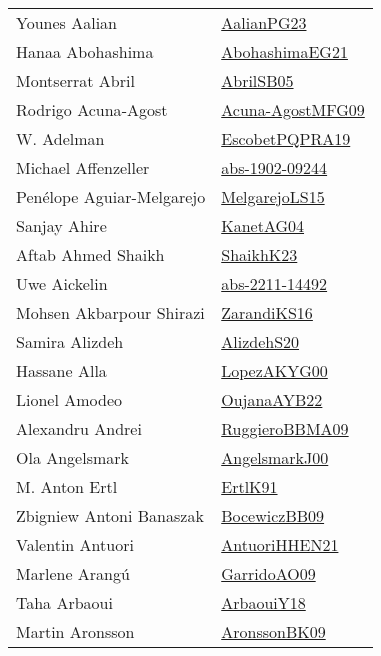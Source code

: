 {\begin{longtable}{p{4cm}p{20cm}}
Younes Aalian & \href{papers/AalianPG23.pdf}{AalianPG23}\cite{AalianPG23} \\
Hanaa Abohashima & \href{articles/AbohashimaEG21.pdf}{AbohashimaEG21}\cite{AbohashimaEG21} \\
Montserrat Abril & \href{papers/AbrilSB05.pdf}{AbrilSB05}\cite{AbrilSB05} \\
Rodrigo Acuna{-}Agost & \href{papers/Acuna-AgostMFG09.pdf}{Acuna-AgostMFG09}\cite{Acuna-AgostMFG09} \\
W. Adelman & \href{articles/EscobetPQPRA19.pdf}{EscobetPQPRA19}\cite{EscobetPQPRA19} \\
Michael Affenzeller & \href{articles/abs-1902-09244.pdf}{abs-1902-09244}\cite{abs-1902-09244} \\
Pen{\'{e}}lope Aguiar{-}Melgarejo & \href{papers/MelgarejoLS15.pdf}{MelgarejoLS15}\cite{MelgarejoLS15} \\
Sanjay Ahire & \href{}{KanetAG04}\cite{KanetAG04} \\
Aftab Ahmed Shaikh & \href{}{ShaikhK23}\cite{ShaikhK23} \\
Uwe Aickelin & \href{articles/abs-2211-14492.pdf}{abs-2211-14492}\cite{abs-2211-14492} \\
Mohsen Akbarpour Shirazi & \href{articles/ZarandiKS16.pdf}{ZarandiKS16}\cite{ZarandiKS16} \\
Samira Alizdeh & \href{}{AlizdehS20}\cite{AlizdehS20} \\
Hassane Alla & \href{articles/LopezAKYG00.pdf}{LopezAKYG00}\cite{LopezAKYG00} \\
Lionel Amodeo & \href{papers/OujanaAYB22.pdf}{OujanaAYB22}\cite{OujanaAYB22} \\
Alexandru Andrei & \href{articles/RuggieroBBMA09.pdf}{RuggieroBBMA09}\cite{RuggieroBBMA09} \\
Ola Angelsmark & \href{papers/AngelsmarkJ00.pdf}{AngelsmarkJ00}\cite{AngelsmarkJ00} \\
M. Anton Ertl & \href{papers/ErtlK91.pdf}{ErtlK91}\cite{ErtlK91} \\
Zbigniew Antoni Banaszak & \href{}{BocewiczBB09}\cite{BocewiczBB09} \\
Valentin Antuori & \href{papers/AntuoriHHEN21.pdf}{AntuoriHHEN21}\cite{AntuoriHHEN21} \\
Marlene Arang{\'{u}} & \href{articles/GarridoAO09.pdf}{GarridoAO09}\cite{GarridoAO09} \\
Taha Arbaoui & \href{papers/ArbaouiY18.pdf}{ArbaouiY18}\cite{ArbaouiY18} \\
Martin Aronsson & \href{papers/AronssonBK09.pdf}{AronssonBK09}\cite{AronssonBK09} \\

\end{longtable}}
